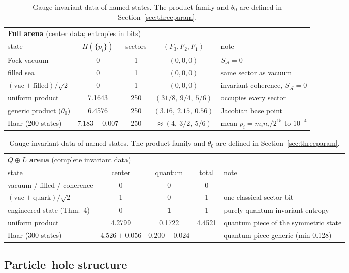 \documentclass[11pt]{article}
\newcommand{\SA}{S_{\mathcal{A}}}
\begin{document}
\begin{table}[ht]
\centering
\footnotesize
\setlength{\tabcolsep}{4pt}
\begin{tabular}{lcccl}
\toprule
\multicolumn{5}{l}{\textbf{Full arena} (center data; entropies in bits)} \\
state & $H(\{p_i\})$ & sectors & $(F_3,F_2,F_1)$ & note \\
\midrule
Fock vacuum & 0 & 1 & $(0,0,0)$ & $\SA = 0$ \\
filled sea & 0 & 1 & $(0,0,0)$ & same sector as vacuum \\
$(\mathrm{vac}+\mathrm{filled})/\sqrt2$ & 0 & 1 & $(0,0,0)$ & invariant coherence, $\SA=0$ \\
uniform product & 7.1643 & 250 & $(31/8,\ 9/4,\ 5/6)$ & occupies every sector \\
generic product ($\theta_0$) & 6.4576 & 250 & $(3.16,\ 2.15,\ 0.56)$ & Jacobian base point \\
Haar (200 states) & $7.183\pm0.007$ & 250 & $\approx(4,\ 3/2,\ 5/6)$ & mean $p_i = m_in_i/2^{15}$ to $10^{-4}$ \\
\bottomrule
\end{tabular}

\medskip

\begin{tabular}{lcccl}
\toprule
\multicolumn{5}{l}{\textbf{$Q\oplus L$ arena} (complete invariant data)} \\
state & center & quantum & total & note \\
\midrule
vacuum / filled / coherence & 0 & 0 & 0 & \\
$(\mathrm{vac}+\mathrm{quark})/\sqrt2$ & 1 & 0 & 1 & one classical sector bit \\
engineered state (Thm.~4) & 0 & \textbf{1} & 1 & purely quantum invariant entropy \\
uniform product & 4.2799 & 0.1722 & 4.4521 & quantum piece of the symmetric state \\
Haar (300 states) & $4.526\pm0.056$ & $0.200\pm0.024$ & --- & quantum piece generic (min 0.128) \\
\bottomrule
\end{tabular}
\caption{Gauge-invariant data of named states. The product family and $\theta_0$ are defined in Section~\ref{sec:threeparam}.}
\label{tab:states}
\end{table}

\subsection{Particle--hole structure}\label{sec:ph}
\end{document}
